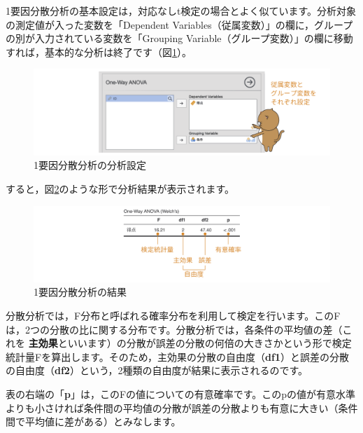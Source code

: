 \documentclass[
  12pt,
  a5jpaper,
  lualatex, ja=standard]{bxjsbook}
\renewcommand{\emph}[1]{\textbf{\color{emph} #1}}
\begin{document}
1要因分散分析の基本設定は，対応なしt検定の場合とよく似ています。分析対象の測定値が入った変数を「Dependent Variables（従属変数）」の欄に，グループの別が入力されている変数を「Grouping Variable（グループ変数）」の欄に移動すれば，基本的な分析は終了です（図\ref{fig:ANOVA-oneway-setvar}）。

\begin{figure}[!ht]

{\centering \includegraphics[width=1\linewidth]{images/ANOVA/oneway-setvar} 

}

\caption{1要因分散分析の分析設定}\label{fig:ANOVA-oneway-setvar}
\end{figure}

すると，図\ref{fig:ANOVA-oneway-results}のような形で分析結果が表示されます。

\begin{figure}[!ht]

{\centering \includegraphics[width=1\linewidth]{images/ANOVA/oneway-results} 

}

\caption{1要因分散分析の結果}\label{fig:ANOVA-oneway-results}
\end{figure}

分散分析では，F分布と呼ばれる確率分布を利用して検定を行います。このFは，2つの分散の比に関する分布です。分散分析では，各条件の平均値の差（これを\emph{主効果}といいます）の分散が誤差の分散の何倍の大きさかという形で検定統計量Fを算出します。そのため，主効果の分散の自由度（\textbf{df1}）と誤差の分散の自由度（\textbf{df2}）という，2種類の自由度が結果に表示されるのです。

表の右端の「\textbf{p}」は，このFの値についての有意確率です。このpの値が有意水準よりも小さければ条件間の平均値の分散が誤差の分散よりも有意に大きい（条件間で平均値に差がある）とみなします。
\end{document}

